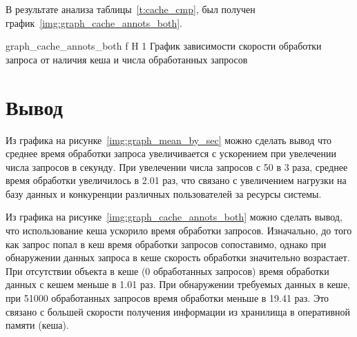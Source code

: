 В результате анализа таблицы~\ref{t:cache_cmp}, был получен график~\ref{img:graph_cache_annots_both}.

{graph_cache_annots_both} %
{f} %
{H} %
{1\textwidth} %
{График зависимости скорости обработки запроса от наличия кеша и числа обработанных запросов} %

\section*{Вывод}
Из графика на рисунке~\ref{img:graph_mean_by_sec} можно сделать вывод что среднее время обработки запроса увеличивается с ускорением при увелечении числа запросов в секунду. При увелечении числа запросов с 50 в 3 раза, среднее время обработки увеличилось в 2.01 раз, что связано с увеличением нагрузки на базу данных и конкуренции различных пользователей за ресурсы системы.

Из графика на рисунке~\ref{img:graph_cache_annots_both} можно сделать вывод, что использование кеша ускорило время обработки запросов. Изначально, до того как запрос попал в кеш время обработки запросов сопоставимо, однако при обнаружении данных запроса в кеше скорость обработки значительно возрастает.
При отсутствии объекта в кеше (0 обработанных запросов) время обработки данных с кешем меньше в 1.01 раз. При обнаружении требуемых данных в кеше, при 51000 обработанных запросов время обработки меньше в 19.41 раз. Это связано с большей скорости получения информации из хранилища в оперативной памяти (кеша).






